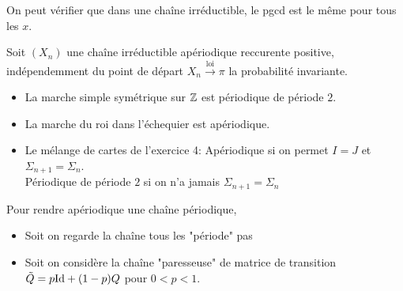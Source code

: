 \documentclass[]{report}
\begin{document}
    \begin{re}{}{}
        On peut vérifier que dans une chaîne irréductible, le pgcd est le même pour tous les $x$.
    \end{re}

    \begin{tm}{}{}
        Soit $(X_n)$ une chaîne irréductible apériodique reccurente positive, indépendemment du point de départ $X_n\overset{\text{loi}}{\longrightarrow}\pi$ la probabilité invariante.
    \end{tm}

    \begin{ex}{}{}
        \begin{itemize}
            \item La marche simple symétrique sur $\mathbb{Z}$ est périodique de période $2$.
            \item La marche du roi dans l'échequier est apériodique.
            \item Le mélange de cartes de l'exercice 4: Apériodique si on permet $I=J$ et $\Sigma_{n+1}=\Sigma_n$.\\
            Périodique de période $2$ si on n'a jamais $\Sigma_{n+1}=\Sigma_n$
        \end{itemize}
    \end{ex}

    \begin{re}{}{}
        Pour rendre apériodique une chaîne périodique,
        \begin{itemize}
            \item Soit on regarde la chaîne tous les "période" pas
            \item Soit on considère la chaîne "paresseuse" de matrice de transition $\tilde{Q}=p \text{Id}+(1-p)Q$ pour $0<p<1$.
        \end{itemize}
    \end{re}
\end{document}
